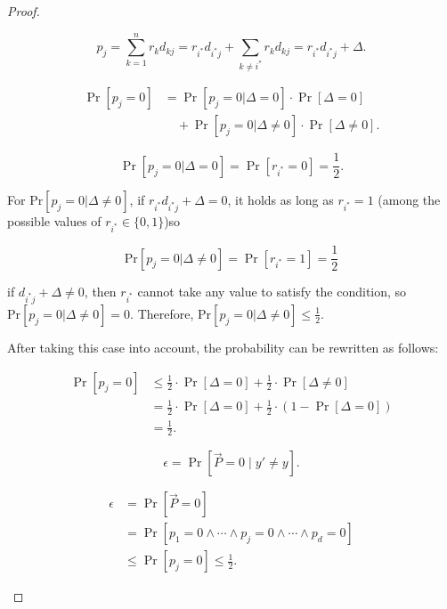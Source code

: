 \documentclass[letterpaper,twocolumn,10pt]{article}
\begin{document}
\begin{proof}
\begin{itemize}
    \begin{equation}\label{eq:pj}
    p_j = \sum_{k=1}^n r_k d_{kj}  
        = r_{i^*} d_{i^* j} + \sum_{k\neq i^*} r_k d_{kj} 
        = r_{i^*} d_{i^* j} + \Delta.
    \end{equation}

    \begin{equation}\label{eq:prob}
    \begin{aligned}
    \Pr[p_j=0] &= \Pr[p_j=0|\Delta=0]\cdot \Pr[\Delta=0] \\
               &\quad + \Pr[p_j=0|\Delta\neq0]\cdot \Pr[\Delta\neq 0].
    \end{aligned}
    \end{equation}

    \begin{equation}\label{eq:half}
    \Pr[p_j=0|\Delta=0] = \Pr[r_{i^*}=0] = \frac{1}{2}.
    \end{equation}

    For $\text{Pr}[p_j=0|\Delta\neq0]$, if $r_{i^*}d_{i^*j} + \Delta = 0$, it holds as long as $r_{i^*}=1$ (among the possible values of $r_{i^*} \in \{0,1\}$)so 
    
    \[
        \text{Pr}[p_j=0|\Delta\neq0] = \Pr[r_{i^*}=1] = \frac{1}{2}
    \]
        
    if $d_{i^*j} + \Delta \neq 0$, then $r_{i^*}$ cannot take any value to satisfy the condition, so $\text{Pr}[p_j=0|\Delta\neq0] = 0$. Therefore, $\text{Pr}[p_j=0|\Delta\neq0] \le \frac{1}{2}$.

    After taking this case into account, the probability can be rewritten as follows:

    \begin{equation}\label{neqzero2-1}
        \begin{aligned}
        \Pr[p_j=0] 
        &\leq \frac{1}{2} \cdot \Pr[\Delta=0] 
           + \frac{1}{2} \cdot \Pr[\Delta\neq 0] \\
        &= \frac{1}{2} \cdot \Pr[\Delta=0] 
           + \frac{1}{2} \cdot (1-\Pr[\Delta=0]) \\
        &= \frac{1}{2}.
        \end{aligned}
    \end{equation}

    \begin{equation}\label{neqzero2-2}
        \epsilon = \Pr[\vec{P}=0 \mid y' \neq y].
    \end{equation}

    \begin{equation}\label{neqzero2-3}
    \begin{aligned}
        \epsilon 
        &= \Pr[\vec{P}=0] \\
        &= \Pr[p_1=0 \wedge \cdots \wedge p_j=0 \wedge \cdots \wedge p_d=0] \\
        &\leq \Pr[p_j=0] \leq \frac{1}{2}.
    \end{aligned}
    \end{equation}


\end{itemize}
\end{proof}
\end{document}
